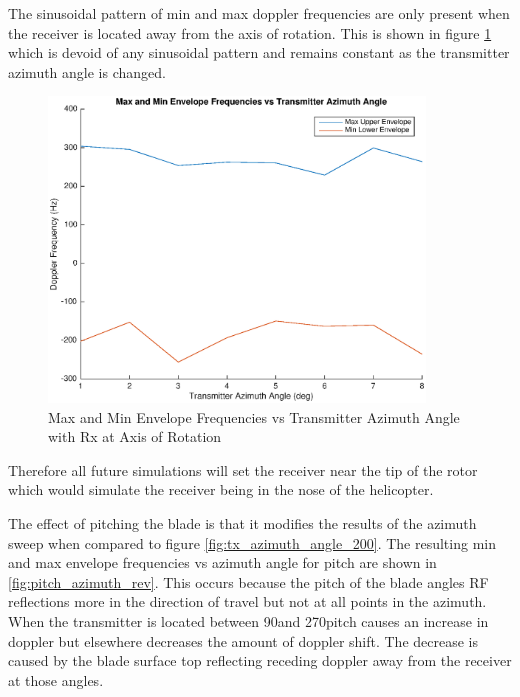 The sinusoidal pattern of min and max doppler frequencies are only present when the receiver is located away from the axis of rotation. This is shown in figure \ref{fig:tx_azimuth_rx0} which is devoid of any sinusoidal pattern and remains constant as the transmitter azimuth angle is changed. 

\begin{figure}
	\begin{center}
		\includegraphics[width=10cm]{images/simulation/Azimuth_angle_rx0_max_doppler.eps}
		\caption{Max and Min Envelope Frequencies vs Transmitter Azimuth Angle with Rx at Axis of Rotation}
		\label{fig:tx_azimuth_rx0}
	\end{center}
\end{figure}

Therefore all future simulations will set the receiver near the tip of the rotor which would simulate the receiver being in the nose of the helicopter.

The effect of pitching the blade is that it modifies the results of the azimuth sweep when compared to figure \ref{fig:tx_azimuth_angle_200}. The resulting min and max envelope frequencies vs azimuth angle for pitch are shown in \ref{fig:pitch_azimuth_rev}. This occurs because the pitch of the blade angles RF reflections more in the direction of travel but not at all points in the azimuth. When the transmitter is located between 90\textdegree and 270\textdegree pitch causes an increase in doppler but elsewhere decreases the amount of doppler shift. The decrease is caused by the blade surface top reflecting receding doppler away from the receiver at those angles.

